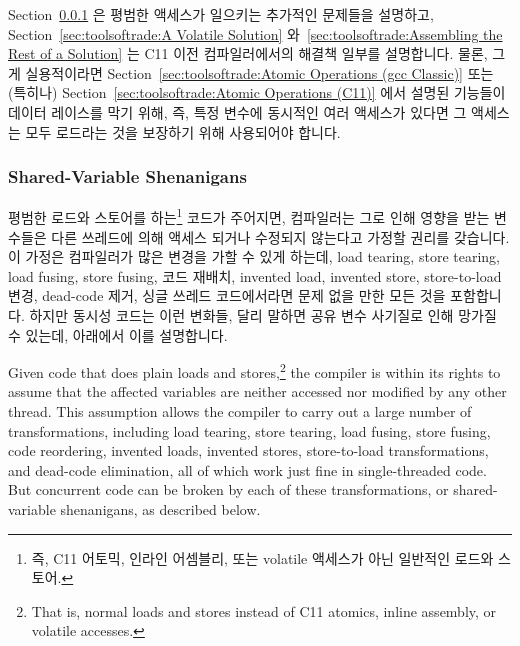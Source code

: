 Section~\ref{sec:toolsoftrade:Shared-Variable Shenanigans}
은 평범한 액세스가 일으키는 추가적인 문제들을 설명하고,
Section~\ref{sec:toolsoftrade:A Volatile Solution}
와~\ref{sec:toolsoftrade:Assembling the Rest of a Solution}
는 C11 이전 컴파일러에서의 해결책 일부를 설명합니다.
물론, 그게 실용적이라면
Section~\ref{sec:toolsoftrade:Atomic Operations (gcc Classic)}
또는 (특히나)
Section~\ref{sec:toolsoftrade:Atomic Operations (C11)}
에서 설명된 기능들이 데이터 레이스를 막기 위해, 즉, 특정 변수에 동시적인 여러
액세스가 있다면 그 액세스는 모두 로드라는 것을 보장하기 위해 사용되어야 합니다.

\subsubsection{Shared-Variable Shenanigans}
\label{sec:toolsoftrade:Shared-Variable Shenanigans}
%
평범한 로드와 스토어를 하는\footnote{
	즉, C11 어토믹, 인라인 어셈블리, 또는 volatile 액세스가 아닌 일반적인
	로드와 스토어.}
코드가 주어지면, 컴파일러는  그로 인해 영향을 받는 변수들은 다른 쓰레드에 의해
액세스 되거나 수정되지 않는다고 가정할 권리를 갖습니다.
이 가정은 컴파일러가 많은 변경을 가할 수 있게 하는데, load tearing, store
tearing, load fusing, store fusing, 코드 재배치, invented load, invented store,
store-to-load 변경, dead-code 제거, 싱글 쓰레드 코드에서라면 문제 없을 만한
모든 것을 포함합니다.
하지만 동시성 코드는 이런 변화들, 달리 말하면 공유 변수 사기질로 인해 망가질 수
있는데, 아래에서 이를 설명합니다.

\iffalse

Given code that does plain loads and stores,\footnote{
	That is, normal loads and stores instead of C11 atomics, inline
	assembly, or volatile accesses.}
the compiler is within
its rights to assume that the affected variables are neither accessed
nor modified by any other thread.
This assumption allows the compiler to carry out a large number of
transformations, including load tearing, store tearing,
load fusing, store fusing, code reordering, invented loads,
invented stores, store-to-load transformations, and dead-code elimination,
all of which work just fine in single-threaded code.
But concurrent code can be broken by each of these transformations,
or shared-variable shenanigans, as described below.

